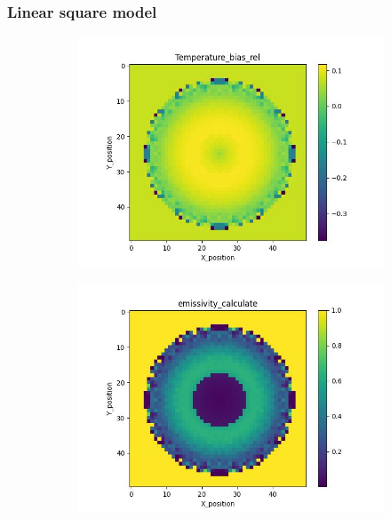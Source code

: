 \subsubsection{Linear square model}

\begin{figure}[htbp]
    \centering
    \begin{minipage}{\textwidth}
        \centering
        \begin{subfigure}{0.49\textwidth}
            \centering
            \includegraphics[width=\textwidth]{figures/raw_data/31/lin_square/T_bias.jpg}
        \end{subfigure}
        \begin{subfigure}{0.49\textwidth}
            \centering
            \includegraphics[width=\textwidth]{figures/raw_data/31/lin_square/emi_cal.jpg}

\end{subfigure}
\end{minipage}
\end{figure}
